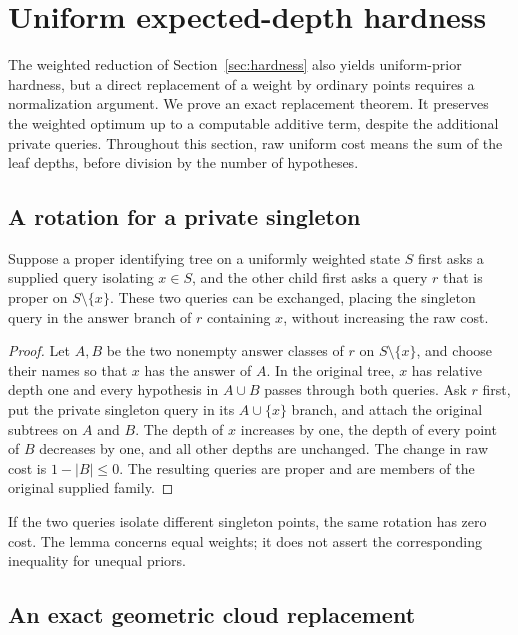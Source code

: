 \section{Uniform expected-depth hardness}
\label{sec:uniform-hardness}

The weighted reduction of Section~\ref{sec:hardness} also yields
uniform-prior hardness, but a direct replacement of a weight by
ordinary points requires a normalization argument. We prove an exact
replacement theorem. It preserves the weighted optimum up to a
computable additive term, despite the additional private queries.
Throughout this section, raw uniform cost means the sum of the leaf
depths, before division by the number of hypotheses.

\subsection{A rotation for a private singleton}

\begin{lemma}\label{lem:uniform-singleton-rotation}
Suppose a proper identifying tree on a uniformly weighted state $S$
first asks a supplied query isolating $x\in S$, and the other child
first asks a query $r$ that is proper on $S\setminus\{x\}$.
These two queries can be exchanged, placing the singleton query
in the answer branch of $r$ containing $x$, without increasing
the raw cost.
\end{lemma}
\begin{proof}
Let $A,B$ be the two nonempty answer classes of $r$ on
$S\setminus\{x\}$, and choose their names so that $x$ has the
answer of $A$. In the original tree, $x$ has relative depth one
and every hypothesis in $A\cup B$ passes through both queries.
Ask $r$ first, put the private singleton query in its
$A\cup\{x\}$ branch, and attach the original subtrees on $A$ and
$B$. The depth of $x$ increases by one, the depth of every point
of $B$ decreases by one, and all other depths are unchanged.
The change in raw cost is $1-|B|\le0$. The resulting queries are
proper and are members of the original supplied family.
\end{proof}

If the two queries isolate different singleton points, the same
rotation has zero cost. The lemma concerns equal weights; it
does not assert the corresponding inequality for unequal priors.

\subsection{An exact geometric cloud replacement}

